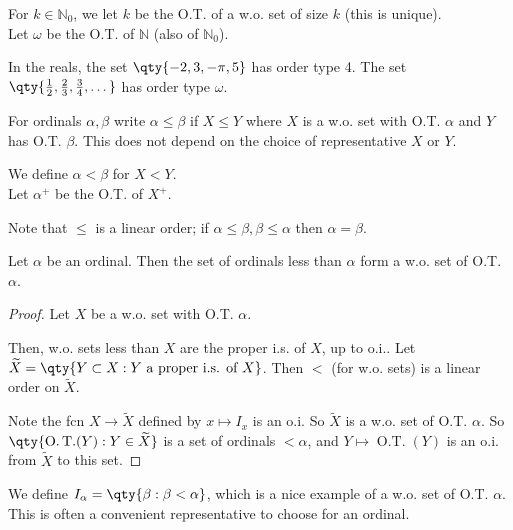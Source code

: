 \begin{example}
    For $k \in \mathbb{N}_0$, we let $k$ be the O.T. of a w.o. set of size $k$ (this is unique). \\
    Let $\omega$ be the O.T. of $\mathbb{N}$ (also of $\mathbb{N}_0$).
\end{example}

\begin{example}
    In the reals, the set $\qty{-2, 3, -\pi, 5}$ has order type 4.
    The set $\qty{\frac{1}{2}, \frac{2}{3}, \frac{3}{4}, \dots}$ has order type $\omega$.
\end{example}

\begin{note}
    For ordinals $\alpha, \beta$ write $\alpha \leq \beta$ if $X \leq Y$ where $X$ is a w.o. set with O.T. $\alpha$ and $Y$ has O.T. $\beta$.
    This does not depend on the choice of representative $X$ or $Y$.

    We define $\alpha < \beta$ for $X < Y$. \\
    Let $\alpha^+$ be the O.T. of $X^+$.
\end{note}

\begin{remark}
    Note that $\leq$ is a linear order; if $\alpha \leq \beta, \beta \leq \alpha$ then $\alpha = \beta$.
\end{remark}

\begin{theorem} \label{thm:9}
    Let $\alpha$ be an ordinal.
    Then the set of ordinals less than $\alpha$ form a w.o. set of O.T. $\alpha$.
\end{theorem}

\begin{proof}
    Let $X$ be a w.o. set with O.T. $\alpha$.

    Then, w.o. sets less than $X$ are the proper i.s. of $X$, up to o.i..
    Let $\widetilde{X} = \qty{Y \subset X : Y \text{ a proper i.s. of } X}$.
    Then $<$ (for w.o. sets) is a linear order on $\widetilde{X}$.

    Note the fcn $X \to \widetilde{X}$ defined by $x \mapsto I_x$ is an o.i.
    So $\widetilde{X}$ is a w.o. set of O.T. $\alpha$.
    So $\qty{\operatorname{O.T.}(Y) : Y \in \widetilde{X}}$ is a set of ordinals $< \alpha$, and $Y \mapsto \operatorname{O.T.}(Y)$ is an o.i. from $\widetilde{X}$ to this set.
\end{proof}

\begin{notation}
    We define $I_\alpha = \qty{\beta : \beta < \alpha}$, which is a nice example of a w.o. set of O.T. $\alpha$.
    This is often a convenient representative to choose for an ordinal.
\end{notation}

